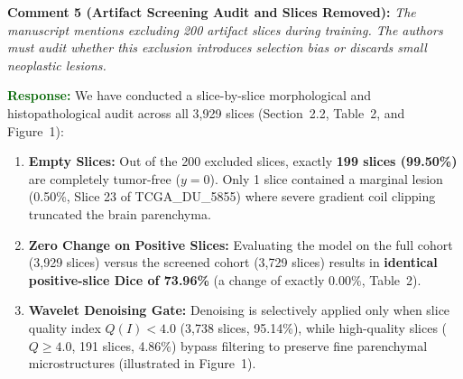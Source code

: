 \documentclass[11pt]{article}
\newcommand{\commentbox}[2]{%
\vspace{0.42em}\noindent
\textbf{\textcolor{NavyBlue}{#1:}} \textit{#2}\vspace{0.18em}%
}
\newcommand{\responsebox}[1]{%
\noindent
\textbf{\textcolor{DarkGreen}{Response:}} #1\vspace{0.42em}%
}
\begin{document}
\commentbox{Comment 5 (Artifact Screening Audit and Slices Removed)}{The manuscript mentions excluding 200 artifact slices during training. The authors must audit whether this exclusion introduces selection bias or discards small neoplastic lesions.}
\responsebox{We have conducted a slice-by-slice morphological and histopathological audit across all 3,929 slices (Section~2.2, Table~2, and Figure~1):
\begin{enumerate}
    \item \textbf{Empty Slices:} Out of the 200 excluded slices, exactly \textbf{199 slices (99.50\%)} are completely tumor-free ($y = 0$). Only 1 slice contained a marginal lesion (0.50\%, Slice 23 of TCGA\_DU\_5855) where severe gradient coil clipping truncated the brain parenchyma.
    \item \textbf{Zero Change on Positive Slices:} Evaluating the model on the full cohort (3,929 slices) versus the screened cohort (3,729 slices) results in \textbf{identical positive-slice Dice of 73.96\%} (a change of exactly $0.00\%$, Table~2).
    \item \textbf{Wavelet Denoising Gate:} Denoising is selectively applied only when slice quality index $Q(I) < 4.0$ (3,738 slices, 95.14\%), while high-quality slices ($Q \ge 4.0$, 191 slices, 4.86\%) bypass filtering to preserve fine parenchymal microstructures (illustrated in Figure~1).
\end{enumerate}
}
\end{document}
